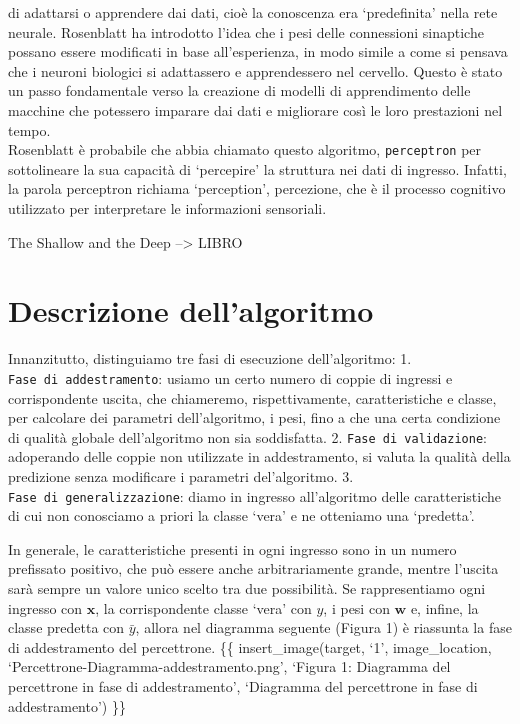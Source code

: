\documentclass[
  letterpaper,
  DIV=11,
  numbers=noendperiod]{scrreprt}
\begin{document}
di adattarsi o apprendere dai dati, cioè la conoscenza era `predefinita'
nella rete neurale. Rosenblatt ha introdotto l'idea che i pesi delle
connessioni sinaptiche possano essere modificati in base all'esperienza,
in modo simile a come si pensava che i neuroni biologici si adattassero
e apprendessero nel cervello. Questo è stato un passo fondamentale verso
la creazione di modelli di apprendimento delle macchine che potessero
imparare dai dati e migliorare così le loro prestazioni nel tempo.\\
Rosenblatt è probabile che abbia chiamato questo algoritmo,
\texttt{perceptron} per sottolineare la sua capacità di `percepire' la
struttura nei dati di ingresso. Infatti, la parola perceptron richiama
`perception', percezione, che è il processo cognitivo utilizzato per
interpretare le informazioni sensoriali.

The Shallow and the Deep --\textgreater{} LIBRO

\section{Descrizione dell'algoritmo}\label{descrizione-dellalgoritmo}

Innanzitutto, distinguiamo tre fasi di esecuzione dell'algoritmo: 1.
\texttt{Fase\ di\ addestramento}: usiamo un certo numero di coppie di
ingressi e corrispondente uscita, che chiameremo, rispettivamente,
caratteristiche e classe, per calcolare dei parametri dell'algoritmo, i
pesi, fino a che una certa condizione di qualità globale dell'algoritmo
non sia soddisfatta. 2. \texttt{Fase\ di\ validazione}: adoperando delle
coppie non utilizzate in addestramento, si valuta la qualità della
predizione senza modificare i parametri del'algoritmo. 3.
\texttt{Fase\ di\ generalizzazione}: diamo in ingresso all'algoritmo
delle caratteristiche di cui non conosciamo a priori la classe `vera' e
ne otteniamo una `predetta'.

In generale, le caratteristiche presenti in ogni ingresso sono in un
numero prefissato positivo, che può essere anche arbitrariamente grande,
mentre l'uscita sarà sempre un valore unico scelto tra due possibilità.
Se rappresentiamo ogni ingresso con \(\mathbf{x}\), la corrispondente
classe `vera' con \(y\), i pesi con \(\mathbf{w}\) e, infine, la classe
predetta con \(\bar{y}\), allora nel diagramma seguente (Figura 1) è
riassunta la fase di addestramento del percettrone. \{\{
insert\_image(target, `1', image\_location,
`Percettrone-Diagramma-addestramento.png', `Figura 1: Diagramma del
percettrone in fase di addestramento', `Diagramma del percettrone in
fase di addestramento') \}\}
\end{document}
